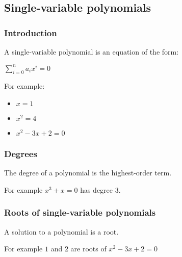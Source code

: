 \subsection{Single-variable polynomials}

\subsubsection{Introduction}

A single-variable polynomial is an equation of the form:

\(\sum^n_{i=0} a_i x^i=0\)

For example:
\begin{itemize}
\item \(x=1\)
\item \(x^2=4\)
\item \(x^2-3x+2=0\)
\end{itemize}

\subsubsection{Degrees}

The degree of a polynomial is the highest-order term.

For example \(x^3+x=0\) has degree \(3\).

\subsubsection{Roots of single-variable polynomials}
A solution to a polynomial is a root.

For example \(1\) and \(2\) are roots of \(x^2-3x+2=0\)

